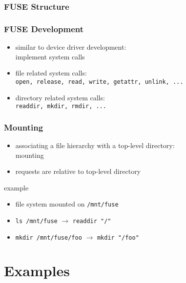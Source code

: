 \documentclass[dvipsnames]{beamer}
\begin{document}
\begin{frame}
  \frametitle{FUSE Structure}

  \begin{center}
  \end{center}
\end{frame}

\begin{frame}
  \frametitle{FUSE Development}

  \begin{itemize}
    \item similar to device driver development:\\
      implement system calls

    \bigskip
    \item file related system calls:\\
      \lstinline|open, release, read, write, getattr, unlink, ...|
    \item directory related system calls:\\
      \lstinline|readdir, mkdir, rmdir, ...|
  \end{itemize}
\end{frame}

\begin{frame}
  \frametitle{Mounting}

  \begin{itemize}
    \item associating a file hierarchy with a top-level directory:\\
      \alert{mounting}
    \item requests are relative to top-level directory
  \end{itemize}

  \begin{exampleblock}{example}
    \begin{itemize}
      \item file system mounted on \texttt{/mnt/fuse}
      \medskip
      \item \texttt{ls /mnt/fuse} $\rightarrow$ \lstinline|readdir "/"|
      \item \texttt{mkdir /mnt/fuse/foo} $\rightarrow$ \lstinline|mkdir "/foo"|
    \end{itemize}
  \end{exampleblock}
\end{frame}

\section{Examples}
\end{document}
